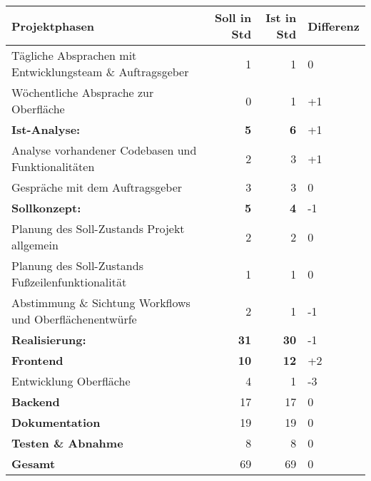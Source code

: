 \begin{tabular}{|l|r|r|l|}
\hline
\textbf{Projektphasen }                                   & \textbf{Soll in Std} & \textbf{Ist in Std} & Differenz \\ \hline
Tägliche Absprachen mit Entwicklungsteam \& Auftragsgeber & 1                    & 1                   & 0         \\ \hline
Wöchentliche Absprache zur Oberfläche                     & 0                    & 1                   & +1        \\ \hline
\textbf{Ist-Analyse: }                                    & \textbf{5}           & \textbf{6}          & +1        \\ \hline
Analyse vorhandener Codebasen und Funktionalitäten        & 2                    & 3                   & +1        \\ \hline
Gespräche mit dem Auftragsgeber                           & 3                    & 3                   & 0         \\ \hline
\textbf{Sollkonzept:  }                                   & \textbf{5}           & \textbf{4}          & -1        \\ \hline
Planung des Soll-Zustands Projekt allgemein               & 2                    & 2                   & 0         \\ \hline
Planung des Soll-Zustands Fußzeilenfunktionalität         & 1                    & 1                   & 0         \\ \hline
Abstimmung \& Sichtung Workflows und Oberflächenentwürfe  & 2                    & 1                   & -1        \\ \hline
\textbf{Realisierung: }                                   & \textbf{31}          & \textbf{30}         & -1        \\ \hline
\textbf{Frontend  }                                       & \textbf{10}          & \textbf{12}         & +2        \\ \hline
Entwicklung Oberfläche                                    & 4                    & 1                   & -3        \\ \hline
\textbf{Backend}                                           & 17                   & 17                  & 0         \\ \hline
	\textbf{Dokumentation }                                   & 19                   & 19                  & 0         \\ \hline
	\textbf{Testen \& Abnahme }                               & 8                    & 8                   & 0         \\ \hline
	\textbf{Gesamt}                                           & 69                   & 69                  & 0         \\ \hline
\end{tabular}\\

